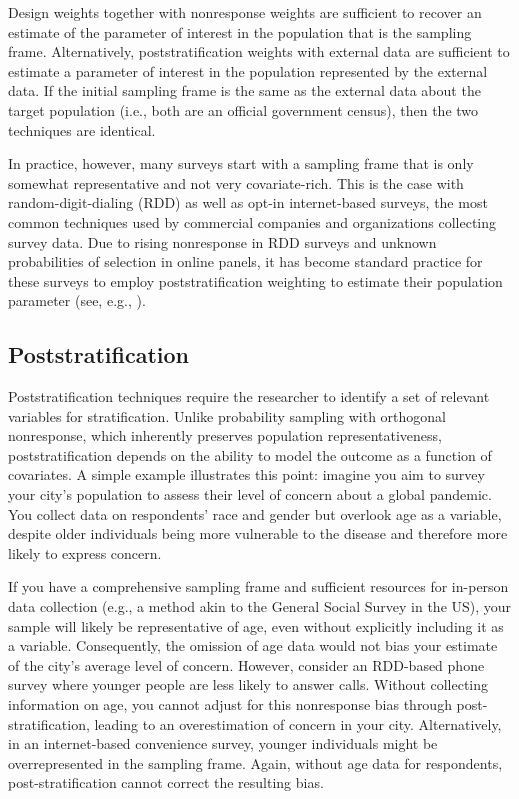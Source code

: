 \documentclass[letterpaper,12pt]{article}
\theoremstyle{proposition}
\begin{document}
Design weights together with nonresponse weights are sufficient to recover an estimate of the parameter of interest in the population that is the sampling frame. Alternatively, poststratification weights with external data are sufficient to estimate a parameter of interest in the population represented by the external data. If the initial sampling frame is the same as the external data about the target population (i.e., both are an official government census), then the two techniques are identical.

In practice, however, many surveys start with a sampling frame that is only somewhat representative and not very covariate-rich. This is the case with random-digit-dialing (RDD) as well as opt-in internet-based surveys, the most common techniques used by commercial companies and organizations collecting survey data. Due to rising nonresponse in RDD surveys and unknown probabilities of selection in online panels, it has become standard practice for these surveys to employ poststratification weighting to estimate their population parameter (see, e.g., \citealt{dever2008internet, Battaglia2009}).

\subsection*{Poststratification}

Poststratification techniques require the researcher to identify a set of relevant variables for stratification. Unlike probability sampling with orthogonal nonresponse, which inherently preserves population representativeness, poststratification depends on the ability to model the outcome as a function of covariates. A simple example illustrates this point: imagine you aim to survey your city’s population to assess their level of concern about a global pandemic. You collect data on respondents’ race and gender but overlook age as a variable, despite older individuals being more vulnerable to the disease and therefore more likely to express concern.

If you have a comprehensive sampling frame and sufficient resources for in-person data collection (e.g., a method akin to the General Social Survey in the US), your sample will likely be representative of age, even without explicitly including it as a variable. Consequently, the omission of age data would not bias your estimate of the city’s average level of concern. However, consider an RDD-based phone survey where younger people are less likely to answer calls. Without collecting information on age, you cannot adjust for this nonresponse bias through post-stratification, leading to an overestimation of concern in your city. Alternatively, in an internet-based convenience survey, younger individuals might be overrepresented in the sampling frame. Again, without age data for respondents, post-stratification cannot correct the resulting bias.
\end{document}
